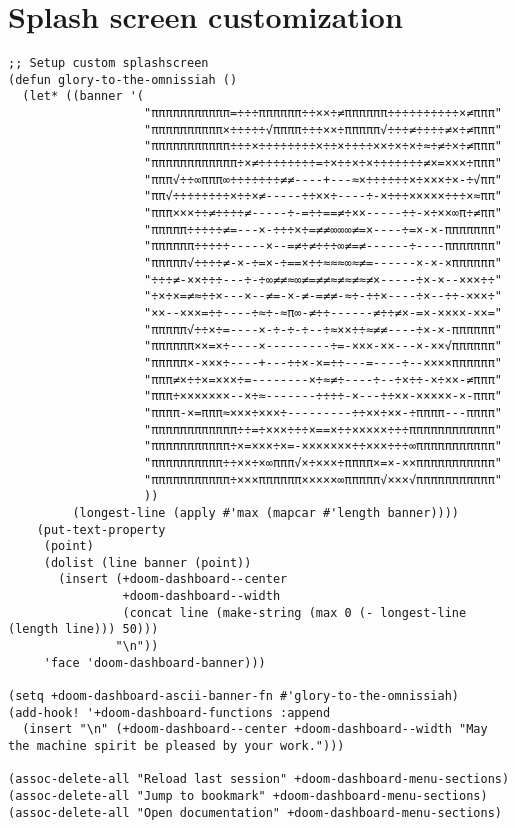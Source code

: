 \documentclass[11pt]{article}
\begin{document}
\section{Splash screen customization}
\label{sec:org2e31bd3}
\begin{verbatim}
;; Setup custom splashscreen
(defun glory-to-the-omnissiah ()
  (let* ((banner '(
                   "πππππππππππ=÷÷÷ππππππ÷÷××÷≠ππππππ÷÷÷÷÷÷÷÷÷÷×≠πππ"
                   "ππππππππππ×÷÷÷÷÷√ππππ÷÷÷××÷πππππ√÷÷÷≠÷÷÷÷≠×÷≠πππ"
                   "πππππππππππ÷÷÷×÷÷÷÷÷÷÷÷×÷÷×÷÷÷÷××÷×÷×÷≈÷≠÷×÷≠πππ"
                   "ππππππππππππ÷×≠÷÷÷÷÷÷÷÷=÷×÷÷×÷×÷÷÷÷÷÷÷≠×=×××÷πππ"
                   "πππ√÷÷∞πππ∞÷÷÷÷÷÷÷≠≠----+---≈×÷÷÷÷÷÷×÷×××÷×-÷√ππ"
                   "ππ√÷÷÷÷÷÷÷÷×÷÷×≠-----÷÷××÷----÷-×÷÷÷×××××÷÷÷×≈ππ"
                   "πππ×××÷÷≠÷÷÷÷≠-----÷-=÷÷==≠÷××-----÷÷-×÷××∞π÷≠ππ"
                   "πππππ÷÷÷÷÷≠=---×-÷÷÷×÷=≠≠∞∞∞≠=×----÷=×-×-πππππππ"
                   "ππππππ÷÷÷÷÷-----×--=≠÷≠÷÷÷∞≠=≠------÷----πππππππ"
                   "πππππ√÷÷÷÷≠-×-÷=×-÷==×÷÷≈≈≈∞≈≠=------×-×-×ππππππ"
                   "÷÷÷≠-××÷÷÷---÷-÷∞≠≠≈∞≠=≠≠≈≠≈≠≈≠×-----÷×-×--×××÷÷"
                   "÷×÷×=≠≈÷÷×---×--≠=-×-≠-=≠≠-≈÷-÷÷×----÷×--÷÷-×××÷"
                   "××--×××=÷÷----÷≈÷-≈π∞-≠÷÷------≠÷÷≠×-=×-××××-××="
                   "πππππ√÷÷×÷=----×-÷-÷-÷--÷≈××÷÷≈≠≠----÷×-×-ππππππ"
                   "ππππππ××=×÷----×---------÷=-×××-××---×-××√ππππππ"
                   "πππππ×-×××÷----+---÷÷×-×=÷÷---=----÷--××××ππππππ"
                   "πππ≠×÷÷×=×××÷=--------×÷≈≠÷----÷--÷×÷÷-×÷××-≠πππ"
                   "πππ÷×××××××--×÷≈-------÷÷÷÷-×---÷÷××-×××××-×-πππ"
                   "ππππ-×=πππ≈×××÷×××÷---------÷÷××÷××-÷ππππ---ππππ"
                   "ππππππππππππ÷÷=÷×××÷÷÷×==×÷÷×××××÷÷÷ππππππππππππ"
                   "πππππππππππ÷×=×××÷×=-×××××××÷÷×××÷÷÷∞πππππππππππ"
                   "ππππππππππ÷÷××÷×∞πππ√×÷×××÷ππππ×=×-××πππππππππππ"
                   "πππππππππππ÷×××ππππππ×××××∞πππππ√×××√πππππππππππ"
                   ))
         (longest-line (apply #'max (mapcar #'length banner))))
    (put-text-property
     (point)
     (dolist (line banner (point))
       (insert (+doom-dashboard--center
                +doom-dashboard--width
                (concat line (make-string (max 0 (- longest-line (length line))) 50)))
               "\n"))
     'face 'doom-dashboard-banner)))

(setq +doom-dashboard-ascii-banner-fn #'glory-to-the-omnissiah)
(add-hook! '+doom-dashboard-functions :append
  (insert "\n" (+doom-dashboard--center +doom-dashboard--width "May the machine spirit be pleased by your work.")))

(assoc-delete-all "Reload last session" +doom-dashboard-menu-sections)
(assoc-delete-all "Jump to bookmark" +doom-dashboard-menu-sections)
(assoc-delete-all "Open documentation" +doom-dashboard-menu-sections)
\end{verbatim}
\end{document}
